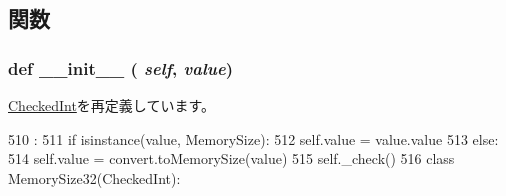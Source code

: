 \subsection{関数}
\hypertarget{classm5_1_1params_1_1MemorySize_ac775ee34451fdfa742b318538164070e}{
\subsubsection[{\_\-\_\-init\_\-\_\-}]{\setlength{\rightskip}{0pt plus 5cm}def \_\-\_\-init\_\-\_\- ( {\em self}, \/   {\em value})}}
\label{classm5_1_1params_1_1MemorySize_ac775ee34451fdfa742b318538164070e}


\hyperlink{classm5_1_1params_1_1CheckedInt_ac775ee34451fdfa742b318538164070e}{CheckedInt}を再定義しています。


\begin{DoxyCode}
510                              :
511         if isinstance(value, MemorySize):
512             self.value = value.value
513         else:
514             self.value = convert.toMemorySize(value)
515         self._check()
516 
class MemorySize32(CheckedInt):
\end{DoxyCode}


